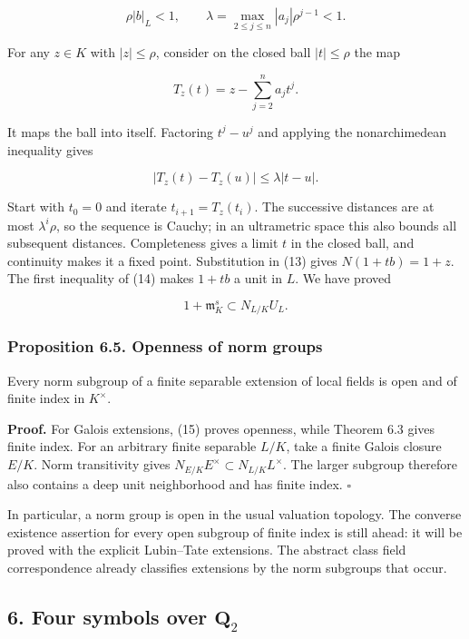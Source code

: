\documentclass[11pt,a4paper]{article}
\begin{document}
\[
\rho |b|_L<1,\qquad
\lambda=\max_{2\leq j\leq n}|a_j|\rho^{j-1}<1.
\tag{14}
\]

For any \(z\in K\) with \(|z|\leq\rho\), consider on the closed ball
\(|t|\leq\rho\) the map

\[
T_z(t)=z-\sum_{j=2}^n a_jt^j.
\]

It maps the ball into itself. Factoring \(t^j-u^j\) and applying the
nonarchimedean inequality gives

\[
|T_z(t)-T_z(u)|\leq\lambda|t-u|.
\]

Start with \(t_0=0\) and iterate \(t_{i+1}=T_z(t_i)\). The successive
distances are at most \(\lambda^i\rho\), so the sequence is Cauchy; in
an ultrametric space this also bounds all subsequent distances.
Completeness gives a limit \(t\) in the closed ball, and continuity
makes it a fixed point. Substitution in (13) gives \(N(1+tb)=1+z\). The
first inequality of (14) makes \(1+tb\) a unit in \(L\). We have proved

\[
1+\mathfrak m_K^s\subset N_{L/K}U_L.
\tag{15}
\]

\subsubsection{Proposition 6.5. Openness of norm
groups}\label{proposition-6.5.-openness-of-norm-groups}

Every norm subgroup of a finite separable extension of local fields is
open and of finite index in \(K^\times\).

\textbf{Proof.} For Galois extensions, (15) proves openness, while
Theorem 6.3 gives finite index. For an arbitrary finite separable
\(L/K\), take a finite Galois closure \(E/K\). Norm transitivity gives
\(N_{E/K}E^\times\subset N_{L/K}L^\times\). The larger subgroup
therefore also contains a deep unit neighborhood and has finite index.
\(\square\)

In particular, a norm group is open in the usual valuation topology. The
converse existence assertion for every open subgroup of finite index is
still ahead: it will be proved with the explicit Lubin--Tate extensions.
The abstract class field correspondence already classifies extensions by
the norm subgroups that occur.

\subsection{\texorpdfstring{6. Four symbols over
\(\mathbf Q_2\)}{6. Four symbols over \textbackslash mathbf Q\_2}}\label{four-symbols-over-mathbf-q_2}
\end{document}
